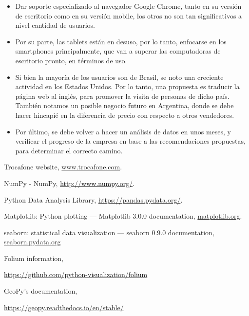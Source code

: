 \documentclass[a4paper ,12pt]{article}
\begin{document}
\begin{itemize}
\item Dar soporte especializado al navegador Google Chrome, tanto en su versión de escritorio como en su versión mobile, los otros no son tan significativos a nivel cantidad de usuarios.

\item Por su parte, las tablets están en desuso, por lo tanto, enfocarse en los smartphones principalmente, que van a superar las computadoras de escritorio pronto, en términos de uso.

\item Si bien la mayoría de los usuarios son de Brasil, se noto una creciente actividad en los Estados Unidos. Por lo tanto, una propuesta es traducir la página web al inglés, para promover la visita de personas de dicho país. También notamos un posible negocio futuro en Argentina, donde se debe hacer hincapié en la diferencia de precio con respecto a otros vendedores.  

\item Por último, se debe volver a hacer un análisis de datos en unos meses, y verificar el progreso de la empresa en base a las recomendaciones propuestas, para determinar el correcto camino.

\end{itemize}


\newpage



\begin{thebibliography}{99}
		
	\bibitem{}Trocafone website, \url{www.trocafone.com}.
	
	\bibitem{} NumPy - NumPy, \url{http://www.numpy.org/}.
	
	\bibitem{} Python Data Analysis Library,
	\url{https://pandas.pydata.org/}.
	
	\bibitem{}	Matplotlib: Python plotting — Matplotlib 3.0.0 documentation,
	\url{matplotlib.org}.
	
	
	\bibitem{}seaborn: statistical data visualization — seaborn 0.9.0 documentation,
	\url{seaborn.pydata.org}
	
	\bibitem{} Folium information,
	
	\url{https://github.com/python-visualization/folium}
	
	\bibitem{} GeoPy’s documentation,
	
	\url{
	https://geopy.readthedocs.io/en/stable/}
\end{thebibliography}
\end{document}
